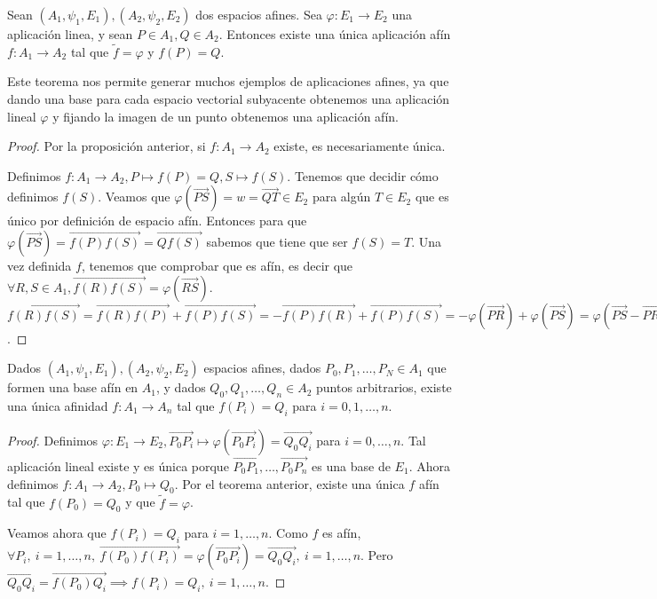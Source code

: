 \documentclass[14pt]{book}
\begin{document}
\begin{tm}
	Sean $(A_1, \psi_1, E_1), (A_2, \psi_2, E_2)$ dos espacios afines. Sea $\varphi : E_1 \to E_2$ una aplicación linea, y sean $P \in A_1, Q \in A_2$. Entonces existe una única aplicación afín $f: A_1 \to A_2$ tal que $\tilde{f} = \varphi$ y $f(P) = Q$.
\end{tm}

Este teorema nos permite generar muchos ejemplos de aplicaciones afines, ya que dando una base para cada espacio vectorial subyacente obtenemos una aplicación lineal $\varphi$ y fijando la imagen de un punto obtenemos una aplicación afín.

\begin{proof}
	Por la proposición anterior, si $f: A_1 \to A_2$ existe, es necesariamente única.
	
	Definimos $f: A_1 \to A_2, P \mapsto f(P) = Q, S \mapsto f(S)$. Tenemos que decidir cómo definimos $f(S)$. Veamos que $\varphi(\overrightarrow{PS}) = w = \overrightarrow{QT} \in E_2$ para algún $T \in E_2$ que es único por definición de espacio afín. Entonces para que $\varphi(\overrightarrow{PS}) = \overrightarrow{f(P)f(S)} = \overrightarrow{Q f(S)}$ sabemos que tiene que ser $f(S) = T$. Una vez definida $f$, tenemos que comprobar que es afín, es decir que $\forall R, S \in A_1, \overrightarrow{f(R) f(S)} = \varphi(\overrightarrow{RS})$. $\overrightarrow{f(R) f(S)} = \overrightarrow{f(R) f(P)} + \overrightarrow{f(P) f(S)} = -\overrightarrow{f(P) f(R)} + \overrightarrow{f(P) f(S)} = -\varphi(\overrightarrow{PR}) + \varphi(\overrightarrow{PS}) = \varphi(\overrightarrow{PS} - \overrightarrow{PR}) = \varphi(\overrightarrow{RS})$.
\end{proof}

\begin{tm}
	Dados $(A_1, \psi_1, E_1), (A_2, \psi_2, E_2)$ espacios afines, dados $P_0, P_1, \dots, P_N \in A_1$ que formen una base afín en $A_1$, y dados $Q_0, Q_1, \dots, Q_n \in A_2$ puntos arbitrarios, existe una única afinidad $f : A_1 \to A_n$ tal que $f(P_i) = Q_i$ para $i = 0, 1, \dots, n$.
\end{tm}

\begin{proof}
	Definimos $\varphi : E_1 \to E_2, \overrightarrow{P_0 P_i} \mapsto \varphi(\overrightarrow{P_0 P_i}) = \overrightarrow{Q_0 Q_i}$ para $i = 0, \dots, n$. Tal aplicación lineal existe y es única porque $\overrightarrow{P_0 P_1}, \dots, \overrightarrow{P_0 P_n}$ es una base de $E_1$. Ahora definimos $f : A_1 \to A_2, P_0 \mapsto Q_0$. Por el teorema anterior, existe una única $f$ afín tal que $f(P_0) = Q_0$ y que $\tilde{f} = \varphi$.
	
	Veamos ahora que $f(P_i) = Q_i$ para $i = 1, \dots, n$. Como $f$ es afín, $\forall P_i,\ i = 1, \dots, n,\ \overrightarrow{f(P_0) f(P_i)} = \varphi(\overrightarrow{P_0 P_i}) = \overrightarrow{Q_0 Q_i},\ i = 1, \dots, n$. Pero $\overrightarrow{Q_0 Q_i} = \overrightarrow{f(P_0) Q_i} \implies f(P_i) = Q_i,\ i = 1, \dots, n$. 
\end{proof}
\end{document}
